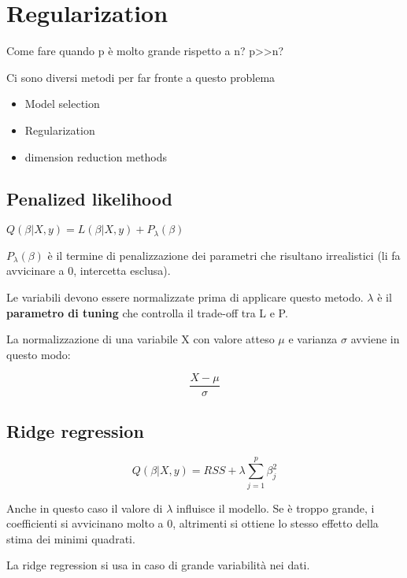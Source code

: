 \newpage

\section{Regularization}

Come fare quando p è molto grande rispetto a n? p>>n?

Ci sono diversi metodi per far fronte a questo problema

\begin{itemize}
 \item Model selection
 \item Regularization
 \item dimension reduction methods
\end{itemize}

\subsection{Penalized likelihood}

$Q(\beta|X,y) = L(\beta|X,y) + P_{\lambda}(\beta)$

$P_{\lambda}(\beta)$ è il termine di penalizzazione dei parametri
che risultano irrealistici (li fa avvicinare a 0, intercetta
esclusa).

Le variabili devono essere normalizzate prima di applicare questo
metodo. $\lambda$ è il \textbf{parametro di tuning} che controlla
il trade-off tra L e P.

La normalizzazione di una variabile X con valore atteso $\mu$ e
varianza $\sigma$ avviene in questo modo:

\begin{equation}
\frac{X-\mu}{\sigma}
\end{equation}

\subsection{Ridge regression}

\begin{equation}
Q(\beta|X,y) = RSS + \lambda \sum_{j = 1}^p \beta_j ^2
\end{equation}

Anche in questo caso il valore di $\lambda$ influisce
il modello. Se è troppo grande, i coefficienti si avvicinano
molto a 0, altrimenti si ottiene lo stesso effetto della stima
dei minimi quadrati.

La ridge regression si usa in caso di grande variabilità nei
dati.
